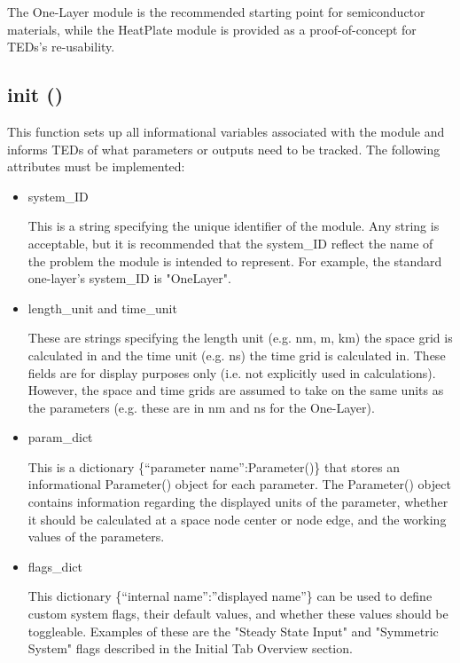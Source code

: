 \documentclass[11pt,letterpaper,titlepage]{article}
\begin{document}
		\par The One-Layer module is the recommended starting point for semiconductor materials, while the HeatPlate module is provided as a proof-of-concept for TEDs's re-usability.
		
		\subsection{\textunderscore\textunderscore init \textunderscore\textunderscore()}
		
		\par This function sets up all informational variables associated with the module and informs TEDs of what parameters or outputs need to be tracked. The following attributes must be implemented:
		
		\begin{itemize}
			\item system\_ID
			\par This is a string specifying the unique identifier of the module. Any string is acceptable, but it is recommended that the system\_ID reflect the name of the problem the module is intended to represent. For example, the standard one-layer's system\_ID is "OneLayer".
			
			\item length\_unit and time\_unit
			\par These are strings specifying the length unit (e.g. nm, m, km) the space grid is calculated in and the time unit (e.g. ns) the time grid is calculated in. These fields are for display purposes only (i.e. not explicitly used in calculations). However, the space and time grids are assumed to take on the same units as the parameters (e.g. these are in nm and ns for the One-Layer).
			
			\item param\_dict
			\par This is a dictionary \{“parameter name”:Parameter()\} that stores an informational Parameter() object for each parameter. The Parameter() object contains information regarding the displayed units of the parameter, whether it should be calculated at a space node center or node edge, and the working values of the parameters.
			
			\item flags\_dict
			\par This dictionary  \{“internal name”:”displayed name”\} can be used to define custom system flags, their default values, and whether these values should be toggleable. Examples of these are the "Steady State Input" and "Symmetric System" flags described in the Initial Tab Overview section.
			

\end{itemize}
\end{document}
